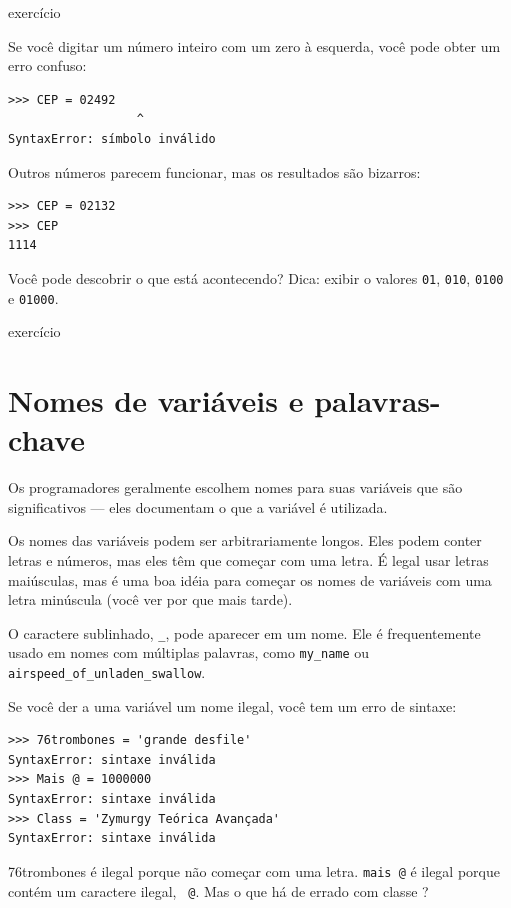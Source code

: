\documentclass[10pt]{book}
\begin{document}
\begin{} exercício

Se você digitar um número inteiro com um zero à esquerda, você pode obter
um erro confuso:

\begin{verbatim}
>>> CEP = 02492
                  ^
SyntaxError: símbolo inválido
\end{verbatim}

Outros números parecem funcionar, mas os resultados são bizarros:

\begin{verbatim}
>>> CEP = 02132
>>> CEP
1114
\end{verbatim}

Você pode descobrir o que está acontecendo? Dica: exibir o
valores {\tt 01}, {\tt 010}, {\tt 0100} e {\tt 01000}.

\end{} exercício



\section{Nomes de variáveis ​​e palavras-chave}

Os programadores geralmente escolhem nomes para suas variáveis ​​que
são significativos --- eles documentam o que a variável é utilizada.

Os nomes das variáveis ​​podem ser arbitrariamente longos. Eles podem conter
letras e números, mas eles têm que começar com uma letra.
É legal usar letras maiúsculas, mas é uma boa idéia
para começar os nomes de variáveis ​​com uma letra minúscula (você
ver por que mais tarde).

O caractere sublinhado, \verb "_", pode aparecer em um nome.
Ele é frequentemente usado em nomes com múltiplas palavras, como
\Verb "my_name" ou \verb "airspeed_of_unladen_swallow".

Se você der a uma variável um nome ilegal, você tem um erro de sintaxe:

\begin{verbatim}
>>> 76trombones = 'grande desfile'
SyntaxError: sintaxe inválida
>>> Mais @ = 1000000
SyntaxError: sintaxe inválida
>>> Class = 'Zymurgy Teórica Avançada'
SyntaxError: sintaxe inválida
\end{verbatim}
%
{76trombones \tt} é ilegal porque não começar com uma letra.
{\tt mais @} é ilegal porque contém um caractere ilegal, {\tt
@}. Mas o que há de errado com classe {\tt}?
\end{document}
